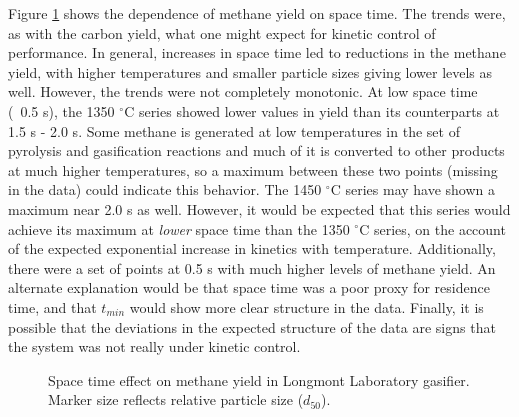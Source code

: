 \documentclass[11pt,twocolumn]{article}
\begin{document}


Figure \ref{fig-Lab-CH4-tau} shows the dependence of methane yield on space time.  The trends were, as with the carbon yield, what one might expect for kinetic control of performance.  In general, increases in space time led to reductions in the methane yield, with higher temperatures and smaller particle sizes giving lower levels as well.  However, the trends were not completely monotonic.  At low space time (~0.5 s), the 1350 $^{\circ}$C series showed lower values in yield than its counterparts at 1.5 s - 2.0 s.  Some methane is generated at low temperatures in the set of pyrolysis and gasification reactions and much of it is converted to other products at much higher temperatures, so a maximum between these two points (missing in the data) could indicate this behavior.  The 1450 $^{\circ}$C series may have shown a maximum near 2.0 s as well.  However, it would be expected that this series would achieve its maximum at \emph{lower} space time than the 1350 $^{\circ}$C series, on the account of the expected exponential increase in kinetics with temperature.  Additionally, there were a set of points at 0.5 s with much higher levels of methane yield.  An alternate explanation would be that space time was a poor proxy for residence time, and that $t_{min}$ would show more clear structure in the data.  Finally, it is possible that the deviations in the expected structure of the data are signs that the system was not really under kinetic control.

\begin{figure}[hbp]

\caption{Space time effect on methane yield in Longmont Laboratory gasifier.  Marker size reflects relative particle size ($d_{50}$).}
\label{fig-Lab-CH4-tau}
\end{figure}
\end{document}
